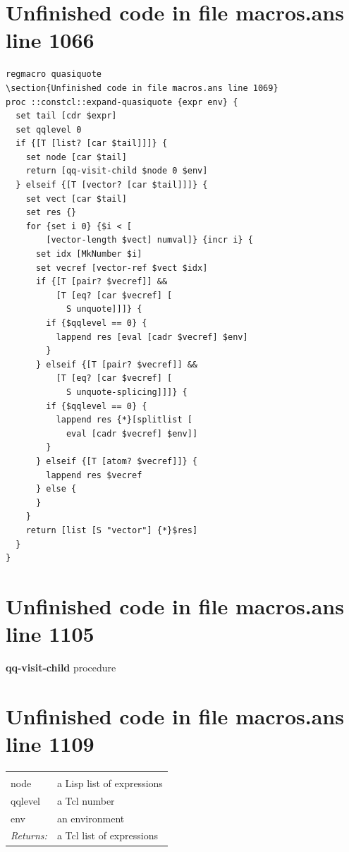 \documentclass[twoside,9pt]{report}
\begin{document}
\section{Unfinished code in file macros.ans line 1066}
\begin{lstlisting}
regmacro quasiquote
\section{Unfinished code in file macros.ans line 1069}
proc ::constcl::expand-quasiquote {expr env} {
  set tail [cdr $expr]
  set qqlevel 0
  if {[T [list? [car $tail]]]} {
    set node [car $tail]
    return [qq-visit-child $node 0 $env]
  } elseif {[T [vector? [car $tail]]]} {
    set vect [car $tail]
    set res {}
    for {set i 0} {$i < [
        [vector-length $vect] numval]} {incr i} {
      set idx [MkNumber $i]
      set vecref [vector-ref $vect $idx]
      if {[T [pair? $vecref]] &&
          [T [eq? [car $vecref] [
            S unquote]]]} {
        if {$qqlevel == 0} {
          lappend res [eval [cadr $vecref] $env]
        }
      } elseif {[T [pair? $vecref]] &&
          [T [eq? [car $vecref] [
            S unquote-splicing]]]} {
        if {$qqlevel == 0} {
          lappend res {*}[splitlist [
            eval [cadr $vecref] $env]]
        }
      } elseif {[T [atom? $vecref]]} {
        lappend res $vecref
      } else {
      }
    }
    return [list [S "vector"] {*}$res]
  }
}
\end{lstlisting}
\section{Unfinished code in file macros.ans line 1105}


\textbf{qq-visit-child} procedure

\section{Unfinished code in file macros.ans line 1109}
\noindent\begin{tabular}{ |p{1.9cm} p{8cm}| }
\hline
\rowcolor[HTML]{CCCCCC} \multicolumn{2}{|l|}{\bf qq-visit-child (internal)} \\
node & a Lisp list of expressions \\
qqlevel & a Tcl number \\
env & an environment \\
\textit{Returns:} & a Tcl list of expressions \\
\hline
\end{tabular}
\end{document}
